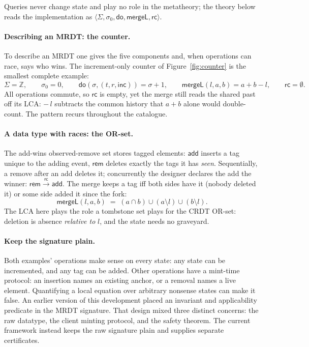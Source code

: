 \documentclass[11pt]{article}
\newcommand{\rc}{\xrightarrow{\mathsf{rc}}}      %
\newcommand{\rcrel}{\mathsf{rc}}                 %
\newcommand{\add}{\mathsf{add}}
\newcommand{\rem}{\mathsf{rem}}
\newcommand{\mergeL}{\mathsf{mergeL}}
\newcommand{\Sinit}{\sigma_0}
\begin{document}
Queries never change state and play no role in the metatheory; the
theory below reads the implementation as
$\langle \Sigma, \Sinit, \mathsf{do}, \mergeL, \rcrel\rangle$.

\paragraph{Describing an MRDT: the counter.} To describe an MRDT one
gives the five components and, when operations can race, says who wins.
The increment-only counter of Figure~\ref{fig:counter} is the smallest
complete example:
\[
  \Sigma = \mathbb{Z}, \qquad \Sinit = 0, \qquad
  \mathsf{do}(\sigma, (t,r,\mathsf{inc})) = \sigma + 1, \qquad
  \mergeL(l,a,b) = a + b - l, \qquad \rcrel = \emptyset .
\]
All operations commute, so $\rcrel$ is empty, yet the merge still reads
the shared past off its LCA: $-\,l$ subtracts the common history that
$a + b$ alone would double-count. The pattern recurs throughout the
catalogue.

\paragraph{A data type with races: the OR-set.} The add-wins observed-remove
set stores tagged elements: $\add$ inserts a tag unique to the adding
event, $\rem$ deletes exactly the tags it has \emph{seen}. Sequentially,
a remove after an add deletes it; concurrently the designer declares the
add the winner: $\rem \rc \add$. The merge keeps a tag iff both sides
have it (nobody deleted it) or some side added it since the fork:
\[
  \mergeL(l,a,b) \;=\; (a \cap b) \cup (a \setminus l) \cup (b \setminus l).
\]
The LCA here plays the role a tombstone set plays for the CRDT OR-set:
deletion is absence \emph{relative to} $l$, and the state needs no
graveyard.

\paragraph{Keep the signature plain.} Both examples' operations make sense on
every state: any state can be incremented, and any tag can be added. Other
operations have a mint-time protocol: an insertion names an existing anchor,
or a removal names a live element. Quantifying a local equation over arbitrary
nonsense states can make it false. An earlier version of this development
placed an invariant and applicability predicate in the MRDT signature. That
design mixed three distinct concerns: the raw datatype, the client minting
protocol, and the safety theorem. The current framework instead keeps the raw
signature plain and supplies separate certificates.
\end{document}
